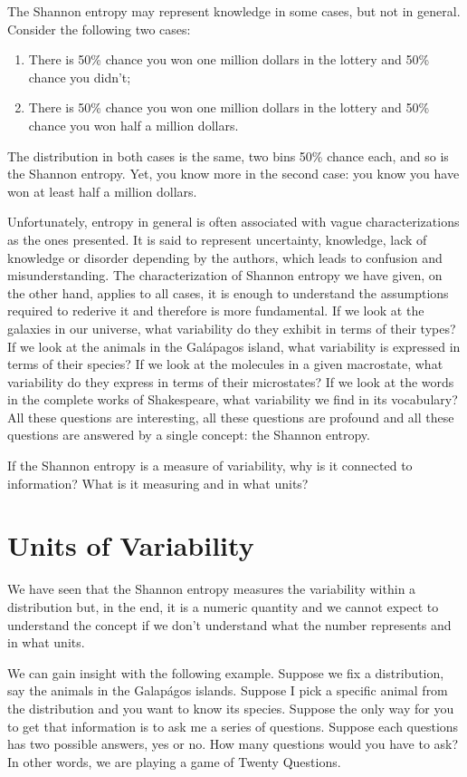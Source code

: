 \documentclass{article}
\begin{document}
The Shannon entropy may represent knowledge in some cases, but not in general. Consider the following two cases:
\begin{enumerate}
    \item There is 50\% chance you won one million dollars in the lottery and 50\% chance you didn't;
    \item There is 50\% chance you won one million dollars in the lottery and 50\% chance you won half a million dollars.
\end{enumerate}
The distribution in both cases is the same, two bins 50\% chance each, and so is the Shannon entropy. Yet, you know more in the second case: you know you have won at least half a million dollars.

Unfortunately, entropy in general is often associated with vague characterizations as the ones presented. It is said to represent uncertainty, knowledge, lack of knowledge or disorder depending by the authors, which leads to confusion and misunderstanding.  The characterization of Shannon entropy we have given, on the other hand, applies to all cases, it is enough to understand the assumptions required to rederive it and therefore is more fundamental. If we look at the galaxies in our universe, what variability do they exhibit in terms of their types? If we look at the animals in the Gal\'{a}pagos island, what variability is expressed in terms of their species? If we look at the molecules in a given macrostate, what variability do they express in terms of their microstates? If we look at the words in the complete works of Shakespeare, what variability we find in its vocabulary? All these questions are interesting, all these questions are profound and all these questions are answered by a single concept: the Shannon entropy.

If the Shannon entropy is a measure of variability, why is it connected to information? What is it measuring and in what units?

\section{Units of Variability\label{uv}}

We have seen that the Shannon entropy measures the variability within a distribution but, in the end, it is a numeric quantity and we cannot expect to understand the concept if we don't understand what the number represents and in what units.

We can gain insight with the following example. Suppose we fix a distribution, say the animals in the Galap\'{a}gos islands. Suppose I pick a specific animal from the distribution and you want to know its species. Suppose the only way for you to get that information is to ask me a series of questions. Suppose each questions has two possible answers, yes or no. How many questions would you have to ask? In other words, we are playing a game of Twenty Questions.
\end{document}
